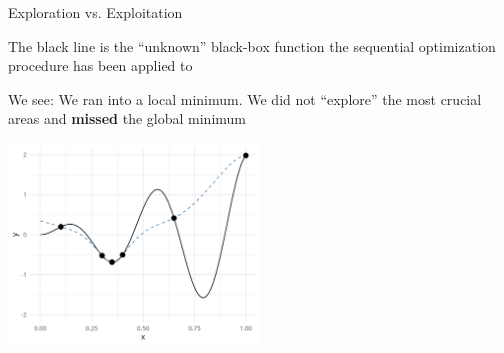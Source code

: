 \documentclass[11pt,compress,t,notes=noshow, xcolor=table]{beamer}
\begin{document}
\begin{vbframe}{Exploration vs. Exploitation}

The black line is the \enquote{unknown} black-box function the sequential optimization procedure has been applied to

\vspace*{0.2cm} 
We see: We ran into a local minimum. We did not \enquote{explore} the most crucial areas and \textbf{missed} the global minimum

\vspace{+.45cm}

\begin{center}
  \includegraphics[width = 0.5\textwidth]{figure_man/loop_10.png}
\end{center}


\end{vbframe} 

\endlecture
\end{document}
